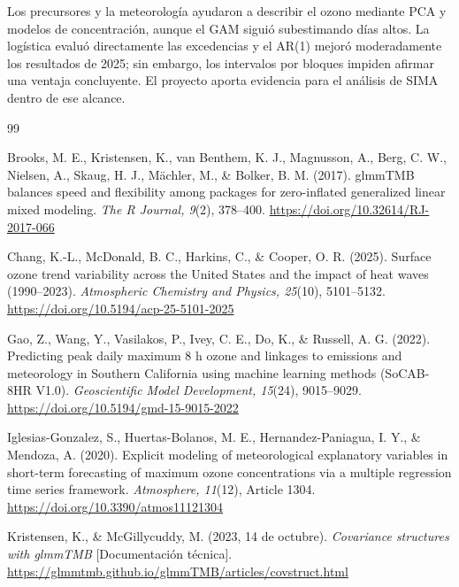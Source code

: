 \documentclass[11pt,letterpaper]{article}
\newenvironment{cambio}{}{}
\begin{document}
\begin{cambio}
Los precursores y la meteorología ayudaron a describir el ozono mediante PCA y modelos de concentración, aunque el GAM siguió subestimando días altos. La logística evaluó directamente las excedencias y el AR(1) mejoró moderadamente los resultados de 2025; sin embargo, los intervalos por bloques impiden afirmar una ventaja concluyente. El proyecto aporta evidencia para el análisis de SIMA dentro de ese alcance.
\end{cambio}

\label{fin:cuerpo}
\clearpage

\begin{thebibliography}{99}

Brooks, M. E., Kristensen, K., van Benthem, K. J., Magnusson, A., Berg, C. W., Nielsen, A., Skaug, H. J., Mächler, M., \& Bolker, B. M. (2017). glmmTMB balances speed and flexibility among packages for zero-inflated generalized linear mixed modeling. \textit{The R Journal, 9}(2), 378--400. \url{https://doi.org/10.32614/RJ-2017-066}

Chang, K.-L., McDonald, B. C., Harkins, C., \& Cooper, O. R. (2025). Surface ozone trend variability across the United States and the impact of heat waves (1990--2023). \textit{Atmospheric Chemistry and Physics, 25}(10), 5101--5132. \url{https://doi.org/10.5194/acp-25-5101-2025}

Gao, Z., Wang, Y., Vasilakos, P., Ivey, C. E., Do, K., \& Russell, A. G. (2022). Predicting peak daily maximum 8 h ozone and linkages to emissions and meteorology in Southern California using machine learning methods (SoCAB-8HR V1.0). \textit{Geoscientific Model Development, 15}(24), 9015--9029. \url{https://doi.org/10.5194/gmd-15-9015-2022}

Iglesias-Gonzalez, S., Huertas-Bolanos, M. E., Hernandez-Paniagua, I. Y., \& Mendoza, A. (2020). Explicit modeling of meteorological explanatory variables in short-term forecasting of maximum ozone concentrations via a multiple regression time series framework. \textit{Atmosphere, 11}(12), Article 1304. \url{https://doi.org/10.3390/atmos11121304}

Kristensen, K., \& McGillycuddy, M. (2023, 14 de octubre). \textit{Covariance structures with glmmTMB} [Documentación técnica]. \url{https://glmmtmb.github.io/glmmTMB/articles/covstruct.html}


\end{thebibliography}
\end{document}
